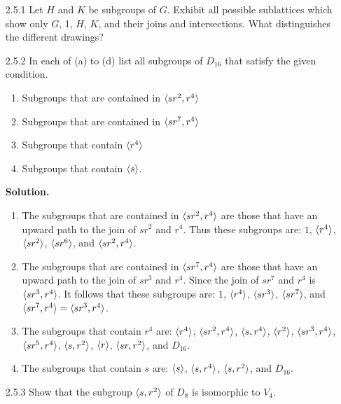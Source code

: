 \begin{enumerate}
   \item[2.5.1]   Let $H$ and $K$ be subgroups of $G$. Exhibit all possible
                  sublattices which show only $G$, 1, $H$, $K$, and their joins
                  and intersections. What distinguishes the different drawings?
   \item[2.5.2]   In each of (a) to (d) list all subgroups of $D_{16}$ that
                  satisfy the given condition.
                  \begin{enumerate}
                     \item Subgroups that are contained in $\langle sr^2, r^4 \rangle$
                     \item Subgroups that are contained in $\langle sr^7, r^4 \rangle$
                     \item Subgroups that contain $\langle r^4 \rangle$
                     \item Subgroups that contain $\langle s \rangle$.
                  \end{enumerate}
                  
      \textbf{Solution.}
      
      \begin{enumerate}
         \item The subgroups that are contained in $\langle sr^2, r^4 \rangle$ are those
               that have an upward path to the join of $sr^2$ and $r^4$. Thus
               these subgroups are: $1$, $\langle r^4 \rangle$, $\langle sr^2 \rangle$,
               $\langle sr^6 \rangle$, and $\langle sr^2, r^4 \rangle$.
         \item The subgroups that are contained in $\langle sr^7, r^4 \rangle$ are those
               that have an upward path to the join of $sr^3$ and $r^4$. Since
               the join of $sr^7$ and $r^4$ is $\langle sr^3, r^4 \rangle$. It follows
               that these subgroups are: $1$, $\langle r^4 \rangle$, $\langle sr^3 \rangle$,
               $\langle sr^7 \rangle$, and $\langle sr^7, r^4 \rangle = \langle sr^3, r^4 \rangle$.
         \item The subgroups that contain $r^4$ are: $\langle r^4 \rangle$,
               $\langle sr^2, r^4 \rangle$, $\langle s, r^4 \rangle$, $\langle r^2 \rangle$,
               $\langle sr^3, r^4 \rangle$, $\langle sr^5, r^4 \rangle$, $\langle s, r^2 \rangle$, $\langle r \rangle$,
               $\langle sr, r^2 \rangle$, and $D_{16}$.
         \item The subgroups that contain $s$ are: $\langle s \rangle$, $\langle s, r^4 \rangle$,
               $\langle s, r^2 \rangle$, and $D_{16}$.
      \end{enumerate}
   \item[2.5.3]   Show that the subgroup $\langle s, r^2 \rangle$ of $D_8$ is isomorphic
                  to $V_4$.
                  

\end{enumerate}
